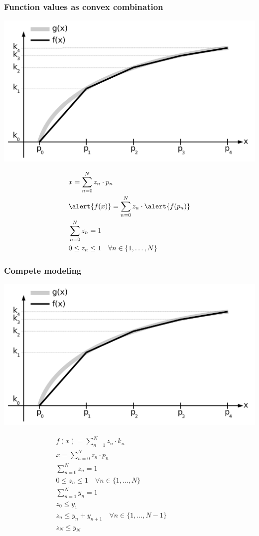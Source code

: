 \begin{frame}
 \frametitle{Function values as convex combination}
 \begin{flushright}
  \includegraphics[width=.5\textwidth,page=2]{Bilder/StueckweiseLineareFunktion1}
 \end{flushright}
 \vspace{-5ex}
 \begin{align*}
  &x = \sum_{n=0}^{N} z_n\cdot p_n\\
  &\alert{f(x)} = \sum_{n=0}^{N} z_n\cdot \alert{f(p_n)}\\
  &\sum_{n=0}^N z_n = 1\\
  &0 \leq z_n \leq 1\quad\forall n\in\{1, \ldots, N\}\qquad\qquad\mbox{}
 \end{align*}
\end{frame}

\begin{frame}
 \frametitle{Compete modeling}
 \begin{flushright}
  \includegraphics[width=.5\textwidth,page=2]{Bilder/StueckweiseLineareFunktion1}
 \end{flushright}
 \vspace{-15ex}\small
 \begin{align*}
  &f(x) = \sum_{n=1}^N z_n\cdot k_n\\
  &x = \sum_{n=0}^{N} z_n\cdot p_n\\
  &\sum_{n=0}^N z_n = 1\\
  &0 \leq z_n \leq 1\quad\forall n\in\{1, \ldots, N\}\\
  &\sum_{n=1}^{N}{y_n} = 1\\
  &z_0 \leq y_1\\
  &z_n \leq y_n + y_{n+1}\quad\forall n\in\{1, \ldots, N-1\}\qquad\qquad\qquad\mbox{}\\
  &z_N \leq y_N\\
 \end{align*}
\end{frame}

